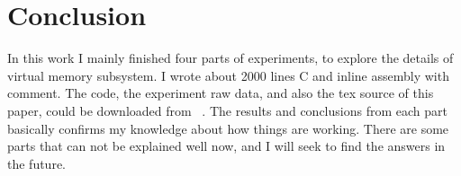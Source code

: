 \section{Conclusion}
    \label{sec:conc}
   In this work I mainly finished four parts of experiments, to explore the
   details of virtual memory subsystem. I wrote about 2000 lines C and inline
   assembly with comment. The code, the experiment raw data, and also the tex
   source of this paper, could be downloaded from ~\cite{github}. The results
   and conclusions from each part basically confirms my knowledge about how
   things are working. There are some parts that can not be explained
   well now, and I will seek to find the answers in the future.
